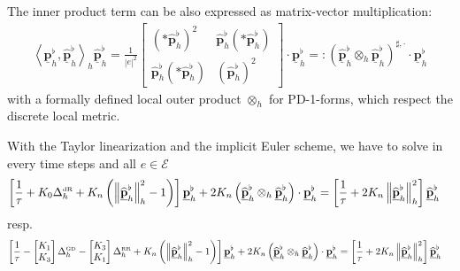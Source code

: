 \documentclass[a4paper,11pt]{scrartcl}
\newcommand{\pflhOld}{\widehat{\mathbf{p}}^{\flat}_{h}}
\newcommand{\PDpflh}{\underline{\mathbf{p}}^{\flat}_{h}}
\newcommand{\PDpflhOld}{\underline{\widehat{\mathbf{p}}}^{\flat}_{h}}
\newcommand{\LB}{\Delta^{\text{\tiny RR}}}
\newcommand{\LCB}{\Delta^{\text{\tiny GD}}}
\newcommand{\LDR}{\Delta^{\text{\tiny dR}}}
\newcommand{\LBh}{\LB_{h}}
\newcommand{\LCBh}{\LCB_{h}}
\newcommand{\LDRh}{\LDR_{h}}
\newcommand{\E}{\mathcal{E}}
\begin{document}
    The inner product term can be also expressed as matrix-vector multiplication:
    \begin{align}
      \left\langle \PDpflh, \PDpflhOld \right\rangle_{h}\PDpflhOld
        = \frac{1}{\left| e \right|^{2}}
            \begin{bmatrix}
              \left( *\pflhOld \right)^{2} & \pflhOld\left( *\pflhOld  \right) \\
              \pflhOld\left( *\pflhOld  \right) & \left( \pflhOld \right)^{2}
            \end{bmatrix} \cdot \PDpflh
        =: \left( \PDpflhOld \otimes_{h} \PDpflhOld \right)^{\sharp,\cdot} \cdot \PDpflh
    \end{align}
    with a formally defined local outer product \( \otimes_{h} \) for PD-1-forms,
    which respect the discrete local metric.

    With the Taylor linearization and the implicit Euler scheme, we have to solve in every time steps and all \( e\in\E \)
    \begin{align}
      \left[ \frac{1}{\tau} + K_{0}\LDRh + K_{n}\left( \left\| \PDpflhOld \right\|_{h}^{2} - 1 \right) \right]\PDpflh
          + 2K_{n} \left( \PDpflhOld \otimes_{h} \PDpflhOld \right) \cdot \PDpflh
          &= \left[\frac{1}{\tau} + 2K_{n}\left\| \PDpflhOld \right\|_{h}^{2}\right]\PDpflhOld
    \end{align}
    resp.
    \begin{align} 
      \left[ \frac{1}{\tau}
          - \begin{bmatrix}
               K_{1} \\ K_{3}
            \end{bmatrix} \LCBh
            -\begin{bmatrix}
               K_{3} \\ K_{1}
            \end{bmatrix} \LBh
          + K_{n}\left( \left\| \PDpflhOld \right\|_{h}^{2} - 1 \right) \right]\PDpflh
          + 2K_{n} \left( \PDpflhOld \otimes_{h} \PDpflhOld \right) \cdot \PDpflh
          &= \left[\frac{1}{\tau} + 2K_{n}\left\| \PDpflhOld \right\|_{h}^{2}\right]\PDpflhOld
    \end{align}

    



  



\end{document}
